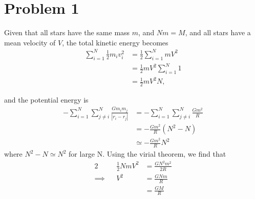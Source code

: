 \documentclass[11pt,letterpaper]{article}
\begin{document}
\section*{Problem 1}

Given that all stars have the same mass $m$, and $Nm=M$, and all stars have a mean velocity of $V$, the total kinetic energy becomes 
\begin{align*}
    \sum^N_{i=1}\frac{1}{2}m_iv_i^2 &= \frac{1}{2}\sum^N_{i=1}mV^2 \\
    &= \frac{1}{2}mV^2\sum^N_{i=1}1 \\
    &= \frac{1}{2}mV^2N,
\end{align*}

and the potential energy is
\begin{align*}
    -\sum^N_{i=1}\sum^N_{j\neq i}\frac{Gm_im_j}{|r_i-r_j|} &= -\sum^N_{i=1}\sum^N_{j\neq i}\frac{Gm^2}{R} \\
    &= -\frac{Gm^2}{R}(N^2-N) \\
    &\simeq -\frac{Gm^2}RN^2
\end{align*}
where $N^2-N \simeq N^2$ for large N. Using the virial theorem, we find that 
\begin{alignat*}{2}
    && \frac{1}{2}NmV^2 &= \frac{GN^2m^2}{2R} \\
    \implies&& V^2 &= \frac{GNm}{R} \\ 
    &&&=\frac{GM}{R}
\end{alignat*}
\end{document}
